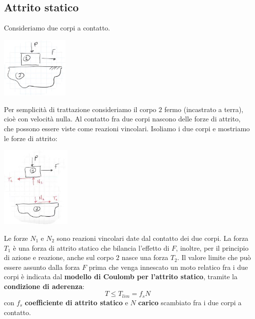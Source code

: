\subsection{Attrito statico}
Consideriamo due corpi a contatto.
\begin{center}
    \includegraphics[height=3cm]{../lezione10/img4.JPG}
\end{center}
Per semplicità di trattazione consideriamo il corpo $2$ fermo (incastrato a terra), cioè con velocità nulla.\newline
\newline
Al contatto fra due corpi nascono delle forze di attrito, che possono essere viste come reazioni vincolari.\newline
\newline
Isoliamo i due corpi e mostriamo le forze di attrito:
\begin{center}
    \includegraphics[height=4cm]{../lezione10/img5.JPG}
\end{center}
Le forze $N_1$ e $N_2$ sono reazioni vincolari date dal contatto dei due corpi.\newline
La forza $T_1$ è una forza di attrito statico che bilancia l'effetto di $F$, inoltre, per il principio di azione e reazione, anche sul corpo $2$ nasce una forza $T_2$.\newline
\newline
Il valore limite che può essere assunto dalla forza $F$ prima che venga innescato un moto relatico fra i due corpi è indicata dal \textbf{modello di Coulomb per l'attrito statico}, tramite la \textbf{condizione di aderenza}: 
\[
    T \leq T_{lim} = f_s N
\]
con $f_s$ \textbf{coefficiente di attrito statico} e $N$ \textbf{carico} scambiato fra i due corpi a contatto.\newline
